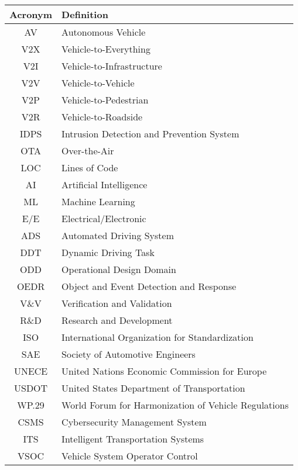 \begin{table}[ht]
    \centering
    \begin{tabular}{|c|l|}
        \hline
        \textbf{Acronym} & \textbf{Definition} \\ \hline
        AV & Autonomous Vehicle \\ \hline
        V2X & Vehicle-to-Everything \\ \hline
        V2I & Vehicle-to-Infrastructure \\ \hline
        V2V & Vehicle-to-Vehicle \\ \hline
        V2P & Vehicle-to-Pedestrian \\ \hline
        V2R & Vehicle-to-Roadside \\ \hline
        IDPS & Intrusion Detection and Prevention System \\ \hline
        OTA & Over-the-Air \\ \hline
        LOC & Lines of Code \\ \hline
        AI & Artificial Intelligence \\ \hline
        ML & Machine Learning \\ \hline
        E/E & Electrical/Electronic \\ \hline
        ADS & Automated Driving System \\ \hline
        DDT & Dynamic Driving Task \\ \hline
        ODD & Operational Design Domain \\ \hline
        OEDR & Object and Event Detection and Response \\ \hline
        V\&V & Verification and Validation \\ \hline
        R\&D & Research and Development \\ \hline
        ISO & International Organization for Standardization \\ \hline
        SAE & Society of Automotive Engineers \\ \hline
        UNECE & United Nations Economic Commission for Europe \\ \hline
        USDOT & United States Department of Transportation \\ \hline
        WP.29 & World Forum for Harmonization of Vehicle Regulations \\ \hline
        CSMS & Cybersecurity Management System \\ \hline
        ITS & Intelligent Transportation Systems \\ \hline
        VSOC & Vehicle System Operator Control \\ \hline

\end{tabular}
\end{table}
